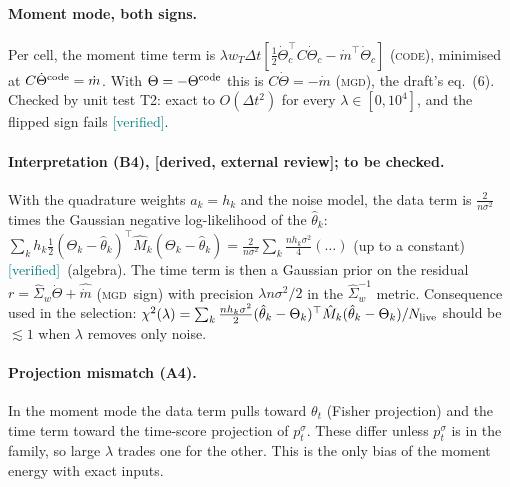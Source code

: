 \documentclass[11pt,a4paper]{article}
\newcommand{\ver}{\textcolor{teal}{\textsf{[verified]}}}
\newcommand{\ext}{\textcolor{purple!80!black}{\textsf{[derived, external review]}}}
\newcommand{\dt}{\Delta t}
\newcommand{\MGD}{\textsc{mgd}}
\newcommand{\cs}{\textsc{code}}
\begin{document}
\paragraph{Moment mode, both signs.} Per cell, the moment time term is $\lambda w_T\dt[\frac12\dot\Theta_c^\top C\dot\Theta_c-\dot m^\top\dot\Theta_c]$ (\cs),
minimised at $C\dot\Theta^{\rm code}=\dot m$. With $\Theta=-\Theta^{\rm code}$ this is $C\dot\Theta=-\dot m$ (\MGD), the draft's eq.~(6). Checked by
unit test T2: exact to $O(\dt^2)$ for every $\lambda\in[0,10^4]$, and the flipped sign fails \ver.

\paragraph{Interpretation (B4), \ext; to be checked.} With the quadrature weights $a_k=h_k$ and the noise model, the data term is
$\frac{2}{n\sigma^2}$ times the Gaussian negative log-likelihood of the $\hat\theta_k$:
$\sum_kh_k\frac12(\Theta_k-\hat\theta_k)^\top\hat M_k(\Theta_k-\hat\theta_k)=\frac{2}{n\sigma^2}\sum_k\frac{nh_k\sigma^2}{4}(\dots)$ (up to a constant) \ver\ (algebra).
The time term is then a Gaussian prior on the residual $r=\hat\Sigma_w\dot\Theta+\hat{\dot m}$ (\MGD\ sign) with precision $\lambda n\sigma^2/2$ in the
$\hat\Sigma_w^{-1}$ metric. Consequence used in the selection: $\chi^2(\lambda)=\sum_k\frac{nh_k\sigma^2}{2}(\hat\theta_k-\Theta_k)^\top\hat M_k(\hat\theta_k-\Theta_k)/N_{\rm live}$
should be $\lesssim1$ when $\lambda$ removes only noise.

\paragraph{Projection mismatch (A4).} In the moment mode the data term pulls toward $\theta_t$ (Fisher projection) and the time term toward the
time-score projection of $p^\sigma_t$. These differ unless $p^\sigma_t$ is in the family, so large $\lambda$ trades one for the other. This is the only
bias of the moment energy with exact inputs.
\end{document}
